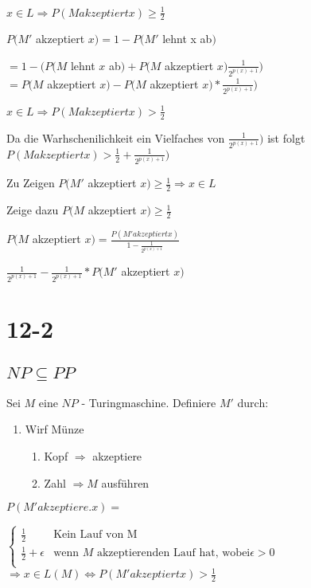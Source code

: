 \documentclass[12pt, oneside, a4paper, numbers=enddot, abstracton, parskip=full]{scrreprt}
\begin{document}
$x \in L \Rightarrow P (M akzeptiert x) \geq \frac{1}{2}$


  $P(M'$ akzeptiert $x) = 1 - P(M'$ lehnt x ab$)$

$= 1 - (P(M$ lehnt $x$ ab$) + P(M$ akzeptiert $x) \frac{1}{2^{p(x)+1}})$ \\
$= P(M$ akzeptiert $x) - P(M$ akzeptiert $x) * \frac{1}{2^{p(x)+1}}) $

$x \in L \Rightarrow P(M akzeptiert x) > \frac{1}{2}$

Da die Warhschenilichkeit ein Vielfaches von $\frac{1}{2^{p(x)+1}})$ ist folgt
$P(M akzeptiert x) > \frac{1}{2} + \frac{1}{2^{p(x)+1}})$

Zu Zeigen $P(M'$ akzeptiert $x) \geq \frac{1}{2} \Rightarrow x \in L$

Zeige dazu $P(M$ akzeptiert $x) \geq \frac{1}{2}$

$P(M$ akzeptiert $x) = \frac{P(M' akzeptiert x)}{1-\frac{1}{2^{p(x)+1}}} $

$ \frac{1}{2^{p(x)+1}} - \frac{1}{2^{p(x)+1}} * P(M'$ akzeptiert $x)$

\section{12-2}
\label{sec:12-2}

\subsection{$NP \subseteq PP$}
Sei $M$ eine $NP$ - Turingmaschine. Definiere $M'$ durch:
\begin{enumerate}
\item Wirf Münze
  \begin{enumerate}
  \item Kopf $\Rightarrow$ akzeptiere
  \item Zahl $\Rightarrow M$  ausführen
  \end{enumerate}
\end{enumerate}

$P(M' akzeptiere. x) = $

\begin{math}
\begin{cases}
    \frac{1}{2} & \text{Kein Lauf von M} \\
    \frac{1}{2} + \epsilon & \text{wenn } M \text{ akzeptierenden Lauf hat, wobei} \epsilon > 0 \\ 
  \end{cases}
\end{math}
  $\Rightarrow x \in L(M) \Leftrightarrow P(M' akzeptiert x) > \frac{1}{2} $
\end{document}
